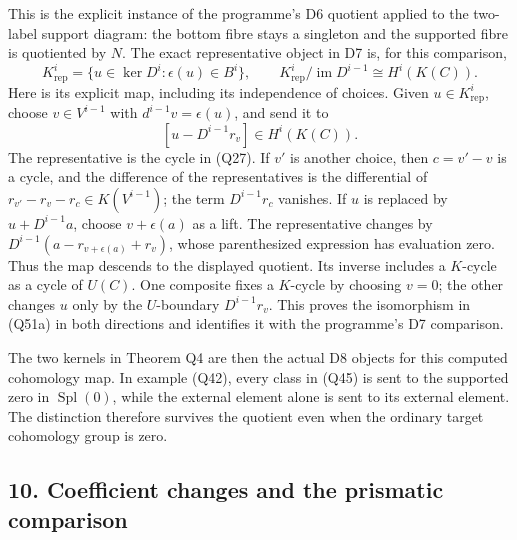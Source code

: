\documentclass[
]{article}
\begin{document}
This is the explicit instance of the programme's D6 quotient applied to
the two-label support diagram: the bottom fibre stays a singleton and
the supported fibre is quotiented by \(N\). The exact representative
object in D7 is, for this comparison, \[
K_{\mathrm{rep}}^i=
\{u\in\ker D^i:\epsilon(u)\in B^i\},
\qquad
K_{\mathrm{rep}}^i/\operatorname{im}D^{i-1}
\cong H^i(K(C)).
\tag{Q51a}
\] Here is its explicit map, including its independence of choices.
Given \(u\in K_{\mathrm{rep}}^i\), choose \(v\in V^{i-1}\) with
\(d^{i-1}v=\epsilon(u)\), and send it to \[
[u-D^{i-1}r_v]\in H^i(K(C)).
\tag{Q51b}
\] The representative is the cycle in (Q27). If \(v'\) is another
choice, then \(c=v'-v\) is a cycle, and the difference of the
representatives is the differential of \(r_{v'}-r_v-r_c\in K(V^{i-1})\);
the term \(D^{i-1}r_c\) vanishes. If \(u\) is replaced by
\(u+D^{i-1}a\), choose \(v+\epsilon(a)\) as a lift. The representative
changes by \(D^{i-1}(a-r_{v+\epsilon(a)}+r_v)\), whose parenthesized
expression has evaluation zero. Thus the map descends to the displayed
quotient. Its inverse includes a \(K\)-cycle as a cycle of \(U(C)\). One
composite fixes a \(K\)-cycle by choosing \(v=0\); the other changes
\(u\) only by the \(U\)-boundary \(D^{i-1}r_v\). This proves the
isomorphism in (Q51a) in both directions and identifies it with the
programme's D7 comparison.

The two kernels in Theorem Q4 are then the actual D8 objects for this
computed cohomology map. In example (Q42), every class in (Q45) is sent
to the supported zero in \(\operatorname{Spl}(0)\), while the external
element alone is sent to its external element. The distinction therefore
survives the quotient even when the ordinary target cohomology group is
zero.

\subsection{10. Coefficient changes and the prismatic
comparison}\label{coefficient-changes-and-the-prismatic-comparison}
\end{document}
